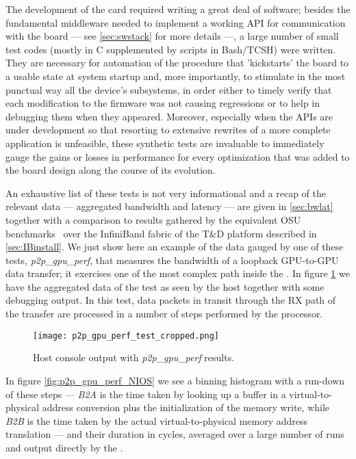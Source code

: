 \label{sec:testsuite}
The development of the \apenetp card required writing a great deal of
software; besides the fundamental middleware needed to implement a
working API for communication with the board --- see \ref{sec:swstack}
for more details ---, a large number of small test codes (mostly in C
supplemented by scripts in Bash/TCSH) were written.
They are necessary for automation of the procedure that 'kickstarts'
the board to a usable state at system startup and, more importantly,
to stimulate in the most punctual way all the device's subsystems, in
order either to timely verify that each modification to the firmware
was not causing regressions or to help in debugging them when they
appeared.
Moreover, especially when the APIs are under development so that
resorting to extensive rewrites of a more complete application is
unfeasible, these synthetic tests are invaluable to immediately gauge
the gains or losses in performance for every optimization that was
added to the board design along the course of its evolution.

An exhaustive list of these tests is not very informational and a
recap of the relevant data --- aggregated bandwidth and latency ---
are given in \ref{sec:bwlat} together with a comparison to results
gathered by the equivalent OSU benchmarks~\cite{Traff:2012:OMB-GPU}
over the InfiniBand fabric of the T\&D platform described in
\ref{sec:IBinstall}.
We just show here an example of the data gauged by one of these tests,
\emph{p2p\_gpu\_perf}, that measures the bandwidth of a loopback
GPU-to-GPU data transfer; it exercises one of the most complex path
inside the \apenetp.
In figure \ref{fig:p2p_gpu_perf_host} we have the aggregated data of
the test as seen by the host together with some debugging output.
In this test, data packets in transit through the RX path of the
transfer are processed in a number of steps performed by the \nios
processor.

\begin{figure}[!hbt]
  \centering
\centering
  \texttt{[image: p2p\_gpu\_perf\_test\_cropped.png]}
  \caption{Host console output with \textit{p2p\_gpu\_perf} results.}
  \label{fig:p2p_gpu_perf_host}
\end{figure}

In figure \ref{fig:p2p_gpu_perf_NIOS} we see a binning histogram with
a run-down of these steps --- \eg \emph{B2A} is the time taken by
looking up a buffer in a virtual-to-physical address conversion plus
the initialization of the memory write, while \emph{B2B} is the time
taken by the actual virtual-to-physical memory address translation ---
and their duration in cycles, averaged over a large number of runs and
output directly by the \nios.

